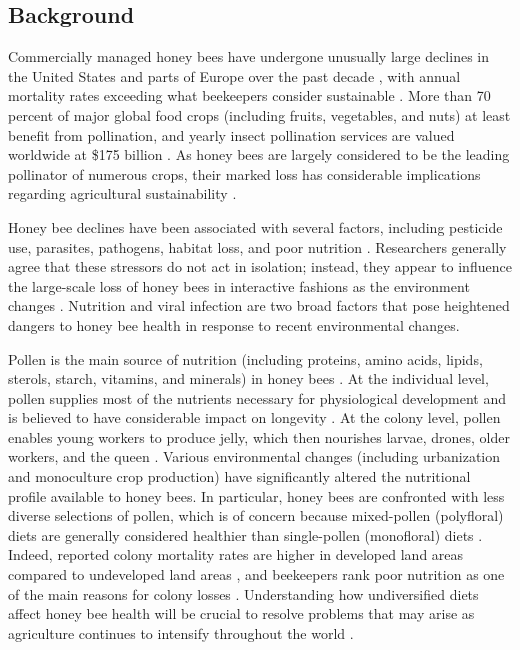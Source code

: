 \documentclass{bmcart}
\begin{document}
\begin{linenumbers} %
\begin{doublespacing} %

\section*{Background}

Commercially managed honey bees have undergone unusually large declines in the United States and parts of Europe over the past decade \cite{ccd1, ccd2, ccd3}, with annual mortality rates exceeding what beekeepers consider sustainable \cite{ccd5, ccd6}. More than 70 percent of major global food crops (including fruits, vegetables, and nuts) at least benefit from pollination, and yearly insect pollination services are valued worldwide at \$175 billion \cite{ccd7}. As honey bees are largely considered to be the leading pollinator of numerous crops, their marked loss has considerable implications regarding agricultural sustainability \cite{ccd4}.

Honey bee declines have been associated with several factors, including pesticide use, parasites, pathogens, habitat loss, and poor nutrition \cite{factors, factors2}. Researchers generally agree that these stressors do not act in isolation; instead, they appear to influence the large-scale loss of honey bees in interactive fashions as the environment changes \cite{interacting}. Nutrition and viral infection are two broad factors that pose heightened dangers to honey bee health in response to recent environmental changes.

Pollen is the main source of nutrition (including proteins, amino acids, lipids, sterols, starch, vitamins, and minerals) in honey bees \cite{source, source2}. At the individual level, pollen supplies most of the nutrients necessary for physiological development \cite{brodschneider} and is believed to have considerable impact on longevity \cite{longevity}. At the colony level, pollen enables young workers to produce jelly, which then nourishes larvae, drones, older workers, and the queen \cite{jelly, jelly2}. Various environmental changes (including urbanization and monoculture crop production) have significantly altered the nutritional profile available to honey bees. In particular, honey bees are confronted with less diverse selections of pollen, which is of concern because mixed-pollen (polyfloral) diets are generally considered healthier than single-pollen (monofloral) diets \cite{diverse, diverse2, alaux}. Indeed, reported colony mortality rates are higher in developed land areas compared to undeveloped land areas \cite{undeveloped}, and beekeepers rank poor nutrition as one of the main reasons for colony losses \cite{bkLoss}. Understanding how undiversified diets affect honey bee health will be crucial to resolve problems that may arise as agriculture continues to intensify throughout the world \cite{ag, ag2}.


\end{doublespacing}
\end{linenumbers}
\end{document}

